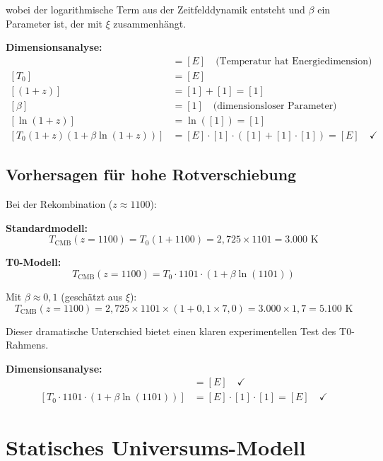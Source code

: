 \documentclass[12pt,a4paper]{report}
\begin{document}
	wobei der logarithmische Term aus der Zeitfelddynamik entsteht und $\beta$ ein Parameter ist, der mit $\xi$ zusammenhängt.
	
	\textbf{Dimensionsanalyse:}
	\begin{align}
		[T(z)] &= [E] \quad \text{(Temperatur hat Energiedimension)} \\
		[T_0] &= [E] \\
		[(1+z)] &= [1] + [1] = [1] \\
		[\beta] &= [1] \quad \text{(dimensionsloser Parameter)} \\
		[\ln(1+z)] &= \ln([1]) = [1] \\
		[T_0(1+z)(1 + \beta \ln(1+z))] &= [E] \cdot [1] \cdot ([1] + [1] \cdot [1]) = [E] \quad \checkmark
	\end{align}
	
	\subsection{Vorhersagen für hohe Rotverschiebung}
	\label{subsec:high_redshift_predictions}
	
	Bei der Rekombination ($z \approx 1100$):
	
	\textbf{Standardmodell:}
	\begin{equation}
		T_{\text{CMB}}(z = 1100) = T_0(1 + 1100) = 2,725 \times 1101 = 3.000 \text{ K}
	\end{equation}
	
	\textbf{T0-Modell:}
	\begin{equation}
		T_{\text{CMB}}(z = 1100) = T_0 \cdot 1101 \cdot (1 + \beta \ln(1101))
	\end{equation}
	
	Mit $\beta \approx 0,1$ (geschätzt aus $\xi$):
	\begin{equation}
		T_{\text{CMB}}(z = 1100) = 2,725 \times 1101 \times (1 + 0,1 \times 7,0) = 3.000 \times 1,7 = 5.100 \text{ K}
	\end{equation}
	
	Dieser dramatische Unterschied bietet einen klaren experimentellen Test des T0-Rahmens.
	
	\textbf{Dimensionsanalyse:}
	\begin{align}
		[T_{\text{CMB}}(z = 1100)] &= [E] \quad \checkmark \\
		[T_0 \cdot 1101 \cdot (1 + \beta \ln(1101))] &= [E] \cdot [1] \cdot [1] = [E] \quad \checkmark
	\end{align}
	
	\section{Statisches Universums-Modell}
	\label{sec:static_universe}
	
\end{document}
